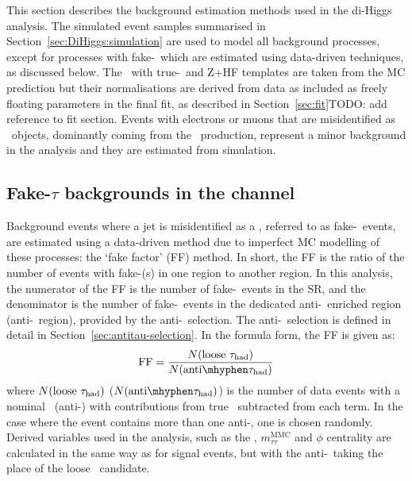 
This section describes the background estimation methods used in the di-Higgs analysis. 
The simulated event samples summarised in Section~\ref{sec:DiHiggs:simulation}
are used to model all background processes, except for processes with fake-\tauhad\ 
which are estimated using data-driven techniques, as discussed below. 
The \ttbar\ with true-\tauhad\ and Z+HF templates are taken from the MC prediction
but their normalisations are derived from data 
as included as freely floating parameters in the final fit,
as described in Section~\ref{sec:fit}TODO: add reference to fit section. 
Events with electrons or muons that are misidentified as \tauhad\ objects, 
dominantly coming from the \ttbar\ production, 
represent a minor background in the analysis and they are estimated from simulation. 

\subsection{Fake-$\tau$ backgrounds in the \lephad channel}
\label{sec:DiHiggs:lephadfake}

Background events where a jet is misidentified as a \tauhad, 
referred to as fake-\tauhad\ events, 
are estimated using a data-driven method due to imperfect MC modelling of these processes:
the `fake factor' (FF) method.
In short, the FF is the ratio of 
the number of events with fake-\tauhad(s) in one region to another region.
In this analysis, 
the numerator of the FF is the number of fake-\tauhad\ events in the
SR, and the denominator is the number of fake-\tauhad\ events in the dedicated 
anti-\tauhad\ enriched region (anti-\tauhad\ region), provided by the
anti-\tauhad\ selection.
The anti-\tauhad\ selection is defined in detail in Section~\ref{sec:antitau-selection}.
In the formula form, the FF is given as:
\begin{equation}
\mathrm{FF} =  \frac{N(\text{loose }\tauhad)}{N(\mathrm{anti}\mhyphen\tauhad)} 
\end{equation} 
where $N(\text{loose }\tau_{\mathrm{had}})$ ($N(\mathrm{anti}\mhyphen\tauhad)$) is the number of 
data events with a nominal \tauhad\ (anti-\tauhad) with 
contributions from true \tauhad\ subtracted from each term.
In the case where the event contains more than one anti-\tauhad, 
one is chosen randomly. Derived variables used in the analysis,
such as the \MET, $m^{\mathrm{MMC}}_{\tau\tau}$ and \MET$\phi$ centrality 
are calculated in the same way as for signal events, 
but with the anti-\tauhad\ taking the place of the loose \tauhad\ candidate.

